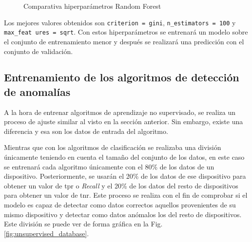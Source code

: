 \begin{figure}[htpb!]
    \centering
    \quad
    \caption{Comparativa hiperparámetros Random Forest}
    \label{fig:comp_hiperparam}
\end{figure}

Los mejores valores obtenidos son \texttt{criterion = gini}, \texttt{n\_estimators = 100} y \texttt{max\_feat ures = sqrt}. Con estos hiperparámetros se entrenará un modelo sobre el conjunto de entrenamiento menor y después se realizará una predicción con el conjunto de validación.


\subsection{Entrenamiento de los algoritmos de detección de anomalías}

A la hora de entrenar algoritmos de aprendizaje no supervisado, se realiza un proceso de ajuste similar al visto en la sección anterior. Sin embargo, existe una diferencia y esa son los datos de entrada del algoritmo.

Mientras que con los algoritmos de clasificación se realizaba una división únicamente teniendo en cuenta el tamaño del conjunto de los datos, en este caso se entrenará cada algoritmo únicamente con el 80\% de los datos de un dispositivo. Posteriormente, se usarán el 20\% de los datos de ese dispositivo para obtener un valor de \acrfull{tpr} o \textit{Recall} y el 20\% de los datos del resto de dispositivos para obtener un valor de \acrfull{tnr}. Este proceso se realiza con el fin de comprobar si el modelo es capaz de detectar como datos correctos aquellos provenientes de su mismo dispositivo y detectar como datos anómalos los del resto de dispositivos. Este división se puede ver de forma gráfica en la Fig. \ref{fig:unsupervised_database}.

